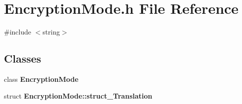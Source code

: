 \section{Encryption\+Mode.\+h File Reference}
\label{EncryptionMode_8h}
{\ttfamily \#include $<$string$>$}\newline
\subsection*{Classes}
\begin{DoxyCompactItemize}
\item 
class \textbf{ Encryption\+Mode}
\item 
struct \textbf{ Encryption\+Mode\+::struct\+\_\+\+Translation}
\end{DoxyCompactItemize}
